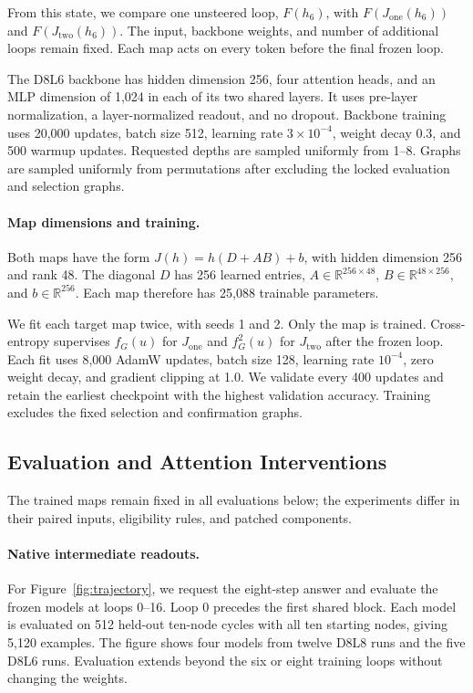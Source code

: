 \documentclass{article}
\begin{document}
From this state, we compare one unsteered loop, $F(h_6)$, with $F(J_{\mathrm{one}}(h_6))$ and $F(J_{\mathrm{two}}(h_6))$. The input, backbone weights, and number of additional loops remain fixed. Each map acts on every token before the final frozen loop.

The D8L6 backbone has hidden dimension 256, four attention heads, and an MLP dimension of 1,024 in each of its two shared layers. It uses pre-layer normalization, a layer-normalized readout, and no dropout. Backbone training uses 20,000 updates, batch size 512, learning rate $3\times10^{-4}$, weight decay 0.3, and 500 warmup updates. Requested depths are sampled uniformly from 1--8. Graphs are sampled uniformly from permutations after excluding the locked evaluation and selection graphs.

\paragraph{Map dimensions and training.}
Both maps have the form $J(h)=h(D+AB)+b$, with hidden dimension 256 and rank 48. The diagonal $D$ has 256 learned entries, $A\in\mathbb{R}^{256\times48}$, $B\in\mathbb{R}^{48\times256}$, and $b\in\mathbb{R}^{256}$. Each map therefore has 25,088 trainable parameters.

We fit each target map twice, with seeds 1 and 2. Only the map is trained. Cross-entropy supervises $f_G(u)$ for $J_{\mathrm{one}}$ and $f_G^2(u)$ for $J_{\mathrm{two}}$ after the frozen loop. Each fit uses 8,000 AdamW updates, batch size 128, learning rate $10^{-4}$, zero weight decay, and gradient clipping at 1.0. We validate every 400 updates and retain the earliest checkpoint with the highest validation accuracy. Training excludes the fixed selection and confirmation graphs.

\subsection{Evaluation and Attention Interventions}
\label{app:n10-mechanism}
The trained maps remain fixed in all evaluations below; the experiments differ in their paired inputs, eligibility rules, and patched components.

\paragraph{Native intermediate readouts.}
For Figure~\ref{fig:trajectory}, we request the eight-step answer and evaluate the frozen models at loops 0--16. Loop 0 precedes the first shared block. Each model is evaluated on 512 held-out ten-node cycles with all ten starting nodes, giving 5,120 examples. The figure shows four models from twelve D8L8 runs and the five D8L6 runs. Evaluation extends beyond the six or eight training loops without changing the weights.
\end{document}
